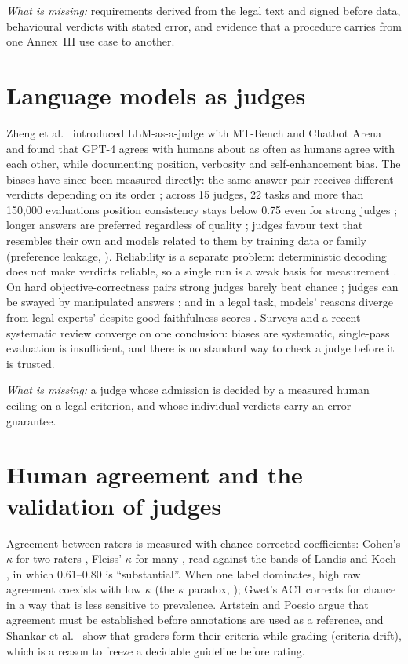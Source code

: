 \emph{What is missing:} requirements derived from the legal text and signed before data, behavioural verdicts with stated error, and evidence that a procedure carries from one Annex~III use case to another.

\section{Language models as judges}
Zheng et al.\ \citep{zheng} introduced LLM-as-a-judge with MT-Bench and Chatbot Arena and found that GPT-4 agrees with humans about as often as humans agree with each other, while documenting position, verbosity and self-enhancement bias. The biases have since been measured directly: the same answer pair receives different verdicts depending on its order \citep{wang2023fair}; across 15 judges, 22 tasks and more than 150{,}000 evaluations position consistency stays below 0.75 even for strong judges \citep{shi2024position}; longer answers are preferred regardless of quality \citep{saito2023}; judges favour text that resembles their own \citep{wataoka2024} and models related to them by training data or family (preference leakage, \citealp{li2025leakage}). Reliability is a separate problem: deterministic decoding does not make verdicts reliable, so a single run is a weak basis for measurement \citep{schroeder2024}. On hard objective-correctness pairs strong judges barely beat chance \citep{judgebench}; judges can be swayed by manipulated answers \citep{thakur2024}; and in a legal task, models' reasons diverge from legal experts' despite good faithfulness scores \citep{namazov2026}. Surveys \citep{gusurvey} and a recent systematic review \citep{shrestha2026} converge on one conclusion: biases are systematic, single-pass evaluation is insufficient, and there is no standard way to check a judge before it is trusted.

\emph{What is missing:} a judge whose admission is decided by a measured human ceiling on a legal criterion, and whose individual verdicts carry an error guarantee.

\section{Human agreement and the validation of judges}
Agreement between raters is measured with chance-corrected coefficients: Cohen's $\kappa$ for two raters \citep{cohen1960}, Fleiss' $\kappa$ for many \citep{fleiss1971}, read against the bands of Landis and Koch \citep{landiskoch}, in which 0.61--0.80 is ``substantial''. When one label dominates, high raw agreement coexists with low $\kappa$ (the $\kappa$ paradox, \citealp{feinstein}); Gwet's AC1 \citep{gwet} corrects for chance in a way that is less sensitive to prevalence. Artstein and Poesio \citep{artstein2008} argue that agreement must be established before annotations are used as a reference, and Shankar et al.\ \citep{shankar2024} show that graders form their criteria while grading (criteria drift), which is a reason to freeze a decidable guideline before rating.

